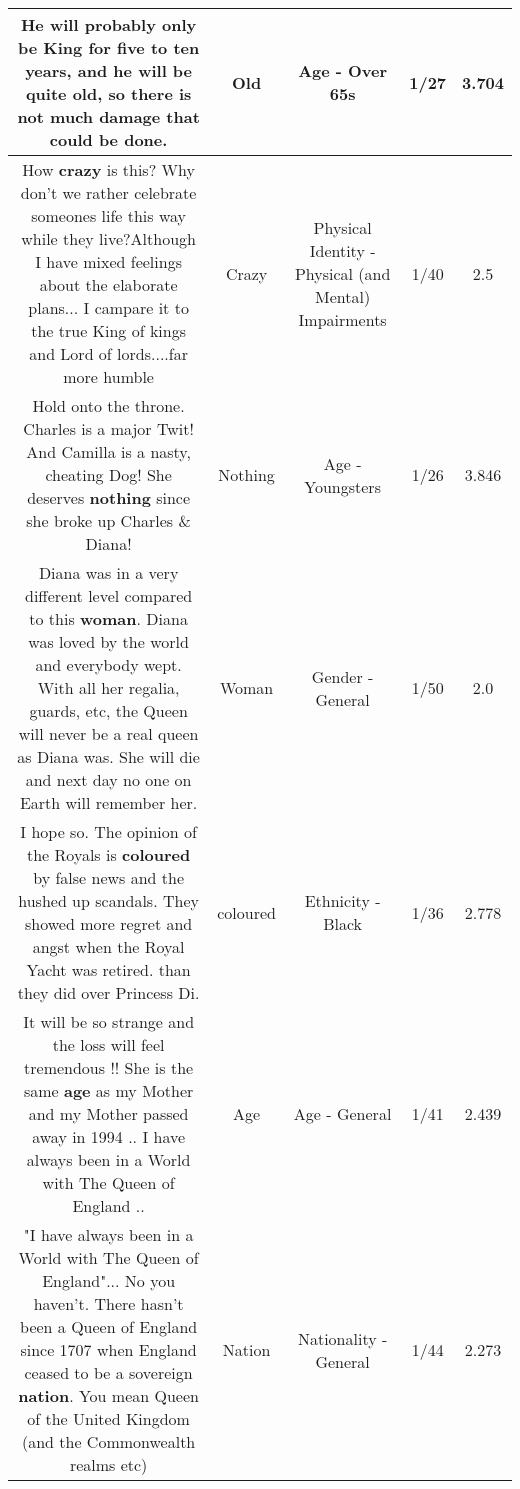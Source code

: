 \documentclass[11pt]{article}
\newlength\mylength
\begin{document}
\begin{center}
\begin{longtable}{|C{.65\mylength}|C{.30\mylength}|C{.12\mylength}|C{.12\mylength}|C{.12\mylength}|}
  \small He will probably only be King for five to ten years, and he will be quite \textbf{old}, so there is not much damage that could be done.\normalsize   & Old & Age - Over 65s & 1/27 & 3.704 \\  \hline
  \small How \textbf{crazy} is this? Why don't we rather celebrate someones life this way while they live?Although I have mixed feelings about the elaborate plans... I campare it to the true King of kings and Lord of lords....far more humble\normalsize   & Crazy & Physical Identity - Physical (and Mental) Impairments & 1/40 & 2.5 \\  \hline
  \small Hold onto the throne.  Charles is a major Twit!  And Camilla is a nasty, cheating Dog!  She deserves \textbf{nothing} since she broke up Charles \& Diana!\normalsize   & Nothing & Age - Youngsters & 1/26 & 3.846 \\  \hline
  \small Diana was in a very different level compared to this \textbf{woman}. Diana was loved by the world and everybody wept. With all her regalia, guards, etc, the Queen will never be a real queen as Diana was.  She will die and next day no one on Earth will remember her.\normalsize   & Woman & Gender - General & 1/50 & 2.0 \\  \hline
  \small I hope so. The opinion of the Royals is \textbf{coloured} by false news and the hushed up scandals. They showed more regret and angst when the Royal Yacht was retired. than they did over Princess Di.\normalsize   & coloured & Ethnicity - Black & 1/36 & 2.778 \\  \hline
  \small It will be so strange and the loss will feel tremendous !! She is the same \textbf{age} as my Mother and my Mother passed away in 1994 .. I have always been in a World with The Queen of England ..\normalsize   & Age & Age - General & 1/41 & 2.439 \\  \hline
  \small "I have always been in a World with The Queen of England"...  No you haven't. There hasn't been a Queen of England since 1707 when England ceased to be a sovereign \textbf{nation}. You mean Queen of the United Kingdom (and the Commonwealth realms etc)\normalsize   & Nation & Nationality - General & 1/44 & 2.273 \\  \hline

\end{longtable}
\end{center}
\end{document}
